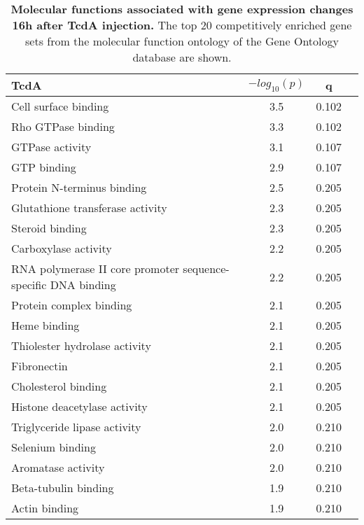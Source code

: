 \begin{table}[h!]
\begin{center}
\begin{tabular}{ l c c c }
TcdA & $-log_{10}(p)$ & q \\ \hline
Cell surface binding & 3.5 & 0.102 \\
Rho GTPase binding & 3.3 & 0.102 \\
GTPase activity & 3.1 & 0.107 \\
GTP binding & 2.9 & 0.107 \\
Protein N-terminus binding & 2.5 & 0.205 \\
Glutathione transferase activity & 2.3 & 0.205 \\
Steroid binding & 2.3 & 0.205 \\
Carboxylase activity & 2.2 & 0.205 \\
RNA polymerase II core promoter sequence-specific DNA binding & 2.2 & 0.205 \\
Protein complex binding & 2.1 & 0.205 \\
Heme binding & 2.1 & 0.205 \\
Thiolester hydrolase activity & 2.1 & 0.205 \\
Fibronectin & 2.1 & 0.205 \\
Cholesterol binding & 2.1 & 0.205 \\
Histone deacetylase activity & 2.1 & 0.205 \\
Triglyceride lipase activity & 2.0 & 0.210 \\
Selenium binding & 2.0 & 0.210 \\
Aromatase activity & 2.0 & 0.210 \\
Beta-tubulin binding & 1.9 & 0.210 \\
Actin binding & 1.9 & 0.210 \\
\end{tabular}
\caption[Molecular functions associated with gene expression changes 16h after TcdA injection]{
 \textbf{Molecular functions associated with gene expression changes 16h after TcdA injection.}
The top 20 competitively enriched gene sets from the molecular 
function ontology of the Gene Ontology database are shown.}
\label{ini:table3}
\end{center}
\end{table}




